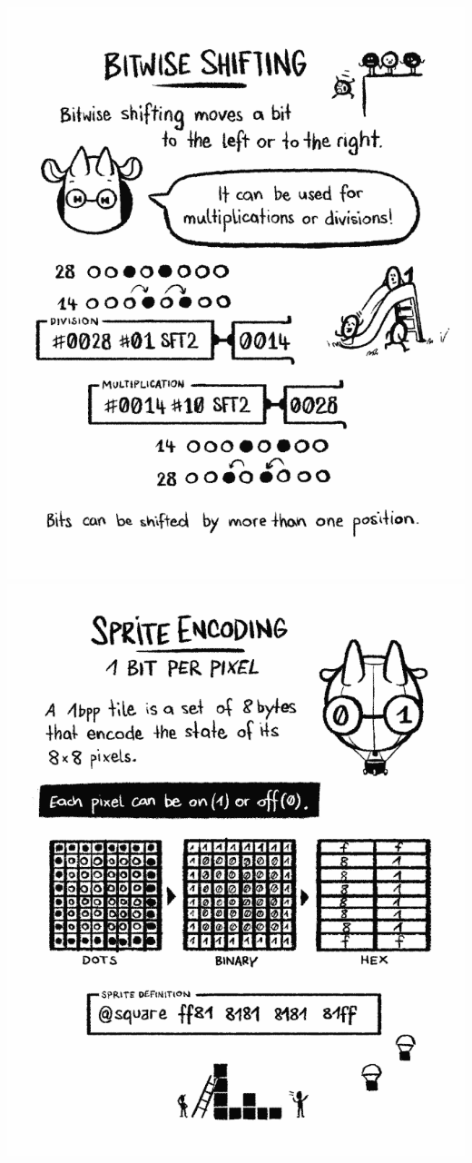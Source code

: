 \documentclass[paperheight=4.25in,paperwidth=2.75in,20pt]{article}
\begin{document}
  \includegraphics[width=1.0\paperwidth]{images/08_bit_shifting-680.png}
  \includegraphics[width=1.0\paperwidth]{images/09_sprite_encoding_1bpp-680.png}
\end{document}
